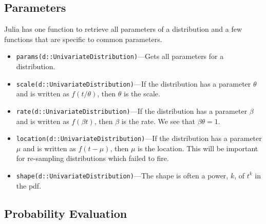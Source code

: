 \documentclass{article}
\begin{document}
\subsection{Parameters}
Julia has one function to retrieve all parameters of a distribution and a few functions that are specific to common parameters.

\begin{itemize}
	\item \texttt{params(d::UnivariateDistribution)}---Gets all parameters for a distribution.
	\item \texttt{scale(d::UnivariateDistribution)}---If the distribution has a parameter $\theta$ and is written as $f(t/\theta)$, then $\theta$ is the scale.
	\item \texttt{rate(d::UnivariateDistribution)}---If the distribution has a parameter $\beta$ and is written as $f(\beta t)$, then $\beta$ is the rate. We see that $\beta\theta = 1$.
	\item \texttt{location(d::UnivariateDistribution)}---If the distribution has a parameter $\mu$ and is written as $f(t-\mu)$, then $\mu$ is the location. This will be important for re-sampling distributions which failed to fire.
	\item \texttt{shape(d::UnivariateDistribution)}---The shape is often a power, $k$, of $t^k$ in the pdf.
\end{itemize}

\subsection{Probability Evaluation}
\end{document}
